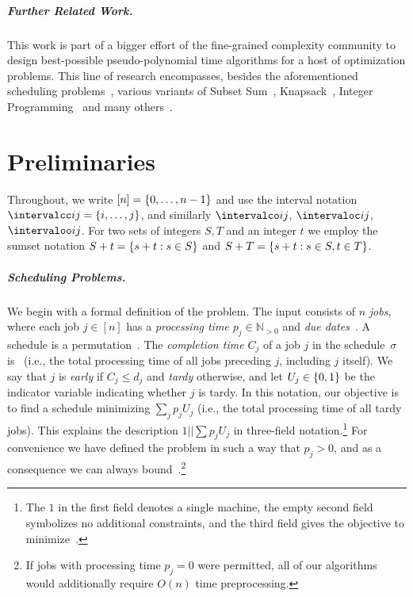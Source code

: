 \documentclass[10pt,a4paper]{article}
\newcommand\Nat{\mathbb N}
\DeclarePairedDelimiter\set{\lbrace}{\rbrace}
\newcommand\Order{O}
\newcommand\MTPT{\smash{$1||\sum p_j U_j$}}
\begin{document}
\subparagraph{Further Related Work.}
This work is part of a bigger effort of the fine-grained complexity community to design best-possible pseudo-polynomial time algorithms for a host of optimization problems. This line of research encompasses, besides the aforementioned scheduling problems~\cite{BringmannFHSW22,HermelinMS22,KleinPR23,SchieberS23}, various variants of Subset Sum~\cite{KoiliarisX19,Bringmann17,AbboudBHS19,AxiotisBJTW19,AxiotisT19,BringmannW21,PolakRW21,AxiotisBBJNTW21,CardinalI21,Potepa21,DengMZ23}, Knapsack~\cite{Tamir09,CyganMWW19,KunnemannPS17,BateniHSS18,EisenbrandW20,PolakRW21,BringmannC23,ChenLMZ24,BringmannC22,Bringmann23,Jin23}, Integer Programming~\cite{EisenbrandW20,JansenR23} and many others~\cite{ChanH22,DengMZ23}.




\section{Preliminaries}
\label{sec:preliminaries}
Throughout, we write $[n] = \set{0, \dots, n-1}$ and use the interval notation $\intervalcc ij = \set{i, \dots, j}$, and similarly $\intervalco ij$, $\intervaloc ij$, $\intervaloo ij$. For two sets of integers $S, T$ and an integer $t$ we employ the sumset notation $S + t = \set{s + t : s \in S}$ and $S + T = \set{s + t : s \in S, t \in T}$.

\subparagraph{Scheduling Problems.}
We begin with a formal definition of the \MTPT{} problem. The input consists of $n$ \emph{jobs}, where each job $j \in [n]$ has a \emph{processing time $p_j \in \Nat_{> 0}$} and \emph{due dates~\makebox{$d_j \in \Nat_{> 0}$}}. A schedule is a permutation~\makebox{$\sigma : [n] \to [n]$}. The \emph{completion time $C_j$} of a job $j$ in the schedule~$\sigma$ is~ (i.e., the total processing time of all jobs preceding $j$, including $j$ itself). We say that $j$ is \emph{early} if $C_j \leq d_j$ and \emph{tardy} otherwise, and let $U_j \in \set{0, 1}$ be the indicator variable indicating whether $j$ is tardy. In this notation, our objective is to find a schedule minimizing $\sum_j p_j U_j$ (i.e., the total processing time of all tardy jobs). This explains the description $1||\sum p_j U_j$ in three-field notation.\footnote{The $1$ in the first field denotes a single machine, the empty second field symbolizes no additional constraints, and the third field gives the objective to minimize~.} For convenience we have defined the problem in such a way that $p_j > 0$, and as a consequence we can always bound~.\footnote{If jobs with processing time $p_j = 0$ were permitted, all of our algorithms would additionally require $\Order(n)$ time preprocessing.}
\end{document}
